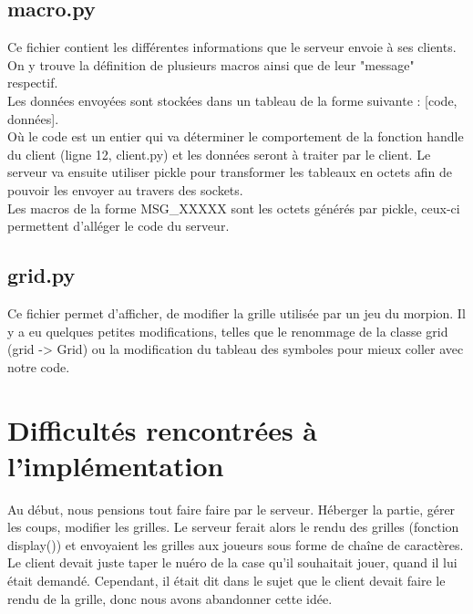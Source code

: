 \documentclass[11pt]{report}
\begin{document}
\subsection{macro.py}

Ce fichier contient les différentes informations que le serveur envoie à ses
clients. On y trouve la définition de plusieurs macros ainsi que de leur
"message" respectif. \\
Les données envoyées sont stockées dans un tableau de la
forme suivante : [code, données]. \\
Où le code est un entier qui va déterminer le comportement de la fonction
handle du client (ligne 12, client.py)
et les données seront à traiter par le client. Le serveur va ensuite utiliser
pickle pour transformer les tableaux en octets afin de pouvoir les envoyer
au travers des sockets. \\
Les macros de la forme MSG\_XXXXX sont les octets générés par pickle,
ceux-ci permettent d'alléger le code du serveur.

\subsection{grid.py}

Ce fichier permet d'afficher, de modifier la grille utilisée par un jeu du
morpion. Il y a eu quelques petites modifications, telles que le renommage de
la classe grid (grid -> Grid) ou la modification du tableau des symboles pour
mieux coller avec notre code.


\newpage

\section{Difficultés rencontrées à l'implémentation}

Au début, nous pensions tout faire faire par le serveur. Héberger la partie,
gérer les coups, modifier les grilles. Le serveur ferait alors le rendu des
grilles (fonction display()) et envoyaient les grilles aux joueurs sous forme
de chaîne de caractères. Le client devait juste taper le nuéro de la case
qu'il souhaitait jouer, quand il lui était demandé.
Cependant, il était dit dans le sujet que le client devait faire le rendu
de la grille, donc nous avons abandonner cette idée.
\end{document}
